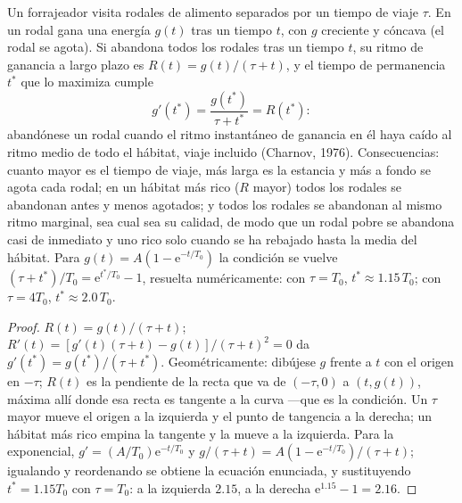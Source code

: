 \begin{theorem}\label{thm:b3:behavioural-ecology:mvt}
Un forrajeador visita rodales de alimento separados por un tiempo de
viaje $\tau$. En un rodal gana una energía $g(t)$ tras un tiempo $t$,
con $g$ creciente y cóncava (el rodal se agota). Si abandona todos los
rodales tras un tiempo $t$, su ritmo de ganancia a largo plazo es
$R(t) = g(t)/(\tau + t)$, y el tiempo de permanencia $t^{*}$ que lo
maximiza cumple
\[
g'(t^{*}) = \frac{g(t^{*})}{\tau + t^{*}} = R(t^{*}) :
\]
abandónese un rodal cuando el ritmo instantáneo de ganancia en él haya
caído al ritmo medio de todo el hábitat, viaje incluido (Charnov,
1976). Consecuencias: cuanto mayor es el tiempo de viaje, más larga es
la estancia y más a fondo se agota cada rodal; en un hábitat más rico
($R$ mayor) todos los rodales se abandonan antes y menos agotados; y
todos los rodales se abandonan al mismo ritmo marginal, sea cual sea su
calidad, de modo que un rodal pobre se abandona casi de inmediato y uno
rico solo cuando se ha rebajado hasta la media del hábitat. Para
$g(t) = A(1 -
\mathrm{e}^{-t/T_{0}})$ la condición se vuelve $(\tau + t^{*})/T_{0} =
\mathrm{e}^{t^{*}/T_{0}} - 1$, resuelta numéricamente: con $\tau = T_{0}$,
$t^{*} \approx 1.15\,T_{0}$; con $\tau = 4T_{0}$, $t^{*} \approx
2.0\,T_{0}$.
\end{theorem}
\begin{proof}
$R(t) = g(t)/(\tau + t)$; $R'(t) = [g'(t)(\tau + t) - g(t)]/(\tau +
t)^{2} = 0$ da $g'(t^{*}) = g(t^{*})/(\tau + t^{*})$. Geométricamente:
dibújese $g$ frente a $t$ con el origen en $-\tau$; $R(t)$ es la
pendiente de la recta que va de $(-\tau, 0)$ a $(t, g(t))$, máxima allí
donde esa recta es tangente a la curva ---que es la condición. Un
$\tau$ mayor mueve el origen a la izquierda y el punto de tangencia a
la derecha; un hábitat más rico empina la tangente y la mueve a la
izquierda. Para la exponencial, $g' = (A/T_{0})
\mathrm{e}^{-t/T_{0}}$ y $g/(\tau + t) = A(1 - \mathrm{e}^{-t/T_{0}})/
(\tau + t)$; igualando y reordenando se obtiene la ecuación enunciada, y
sustituyendo $t^{*} = 1.15T_{0}$ con $\tau = T_{0}$: a la izquierda
$2.15$, a la derecha $\mathrm{e}^{1.15} - 1 = 2.16$.
\end{proof}

